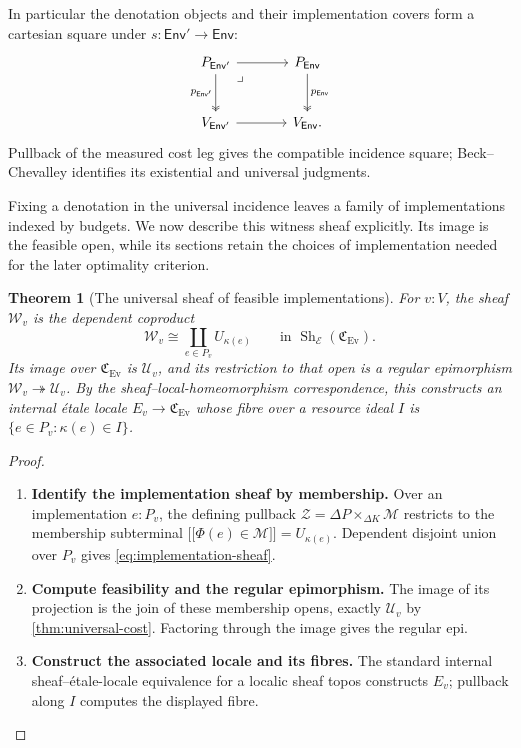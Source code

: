 \documentclass[11pt,a4paper]{article}
\numberwithin{algorithm}{section}
\numberwithin{equation}{section}
\newtheorem{theorem}{Theorem}[section]
\theoremstyle{definition}
\theoremstyle{remark}
\theoremstyle{plain}
\newcommand{\E}{\mathcal E}
\newcommand{\Env}{\mathsf{Env}}
\newcommand{\onto}{\twoheadrightarrow}
\newcommand{\llbracket}{\mathopen{[\![}}
\newcommand{\rrbracket}{\mathclose{]\!]}}
\newcommand{\Ev}{{\operatorname{Ev}}}
\newcommand{\Cplx}{\mathfrak C_{\Ev}}
\newcommand{\Sh}{\operatorname{Sh}}
\theoremstyle{definition}
\theoremstyle{plain}
\begin{document}
In particular the denotation objects and their implementation covers
form a cartesian square under $s:\Env'\to\Env$:
\[
\begin{tikzcd}[column sep=large,row sep=large]
 P_{\Env'} \arrow[dr,phantom,"\lrcorner",very near start] \arrow[r] \arrow[d,two heads,"{p_{\Env'}}"']
   & P_{\Env} \arrow[d,two heads,"{p_{\Env}}"]\\
 V_{\Env'} \arrow[r] & V_{\Env}.
\end{tikzcd}
\]
Pullback of the measured cost leg gives the compatible incidence square;
Beck--Chevalley identifies its existential and universal judgments.


Fixing a denotation in the universal incidence leaves a family of
implementations indexed by budgets. We now describe this witness
sheaf explicitly. Its image is the feasible open, while its sections
retain the choices of implementation needed for the later optimality
criterion.


\begin{theorem}[The universal sheaf of feasible implementations]
\label{thm:implementation-sheaf}
For $v:V$, the sheaf $\mathscr W_v$ is the dependent coproduct
\begin{equation}\label{eq:implementation-sheaf}
 \mathscr W_v\cong
 \coprod_{e\in P_v}U_{\kappa(e)}
 \qquad\text{in }\Sh_{\E}(\Cplx).
\end{equation}
Its image over $\Cplx$ is $\mathcal U_v$, and its
restriction to that open is a regular epimorphism
$\mathscr W_v\onto\mathcal U_v$.
By the sheaf--local-homeomorphism correspondence, this
constructs an internal \'etale locale $E_v\to\Cplx$
whose fibre over a resource ideal $I$ is
$\{e\in P_v:\kappa(e)\in I\}$.
\end{theorem}
\begin{proof}\leavevmode
\begin{enumerate}[leftmargin=*,align=left]
\item \textbf{Identify the implementation sheaf by membership.}
Over an implementation $e:P_v$, the defining pullback
$\mathscr Z=\Delta P\times_{\Delta K}\mathscr M$
restricts to the membership subterminal
$\llbracket\Phi(e)\in\mathscr M\rrbracket
 =U_{\kappa(e)}$.  Dependent disjoint union over $P_v$
gives \eqref{eq:implementation-sheaf}.

\item \textbf{Compute feasibility and the regular epimorphism.}
The image of its
projection is the join of these membership opens, exactly
$\mathcal U_v$ by \cref{thm:universal-cost}.  Factoring
through the image gives the regular epi.

\item \textbf{Construct the associated locale and its fibres.}
The standard
internal sheaf--\'etale-locale equivalence for a localic
sheaf topos \citep{Vickers,MacLaneMoerdijk} constructs $E_v$;
pullback along $I$ computes the displayed fibre.
\end{enumerate}
\end{proof}
\end{document}
